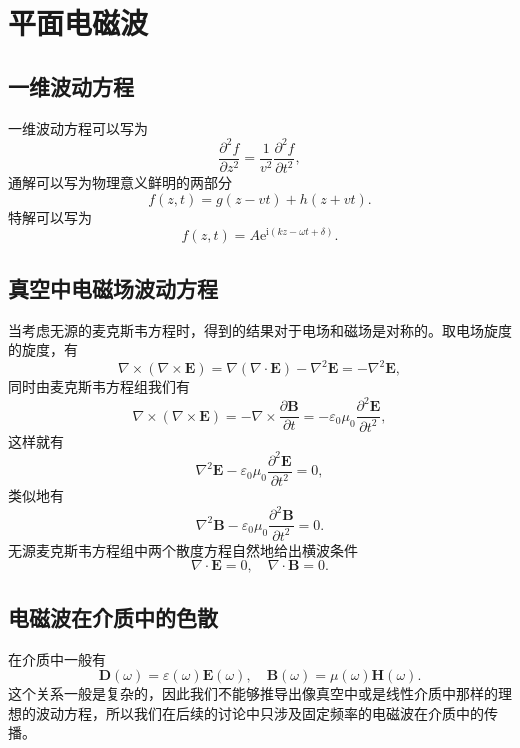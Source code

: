\documentclass[UTF8]{ctexbook}
\newcommand{\e}{\mathrm{e}}
\renewcommand{\b}{\boldsymbol}
\renewcommand{\i}{\mathrm{i}}
\numberwithin{equation}{chapter}
\begin{document}
	\section{平面电磁波}
	\subsection{一维波动方程}
	一维波动方程可以写为
	\[\frac{\partial^2 f}{\partial z^2}=\frac{1}{v^2}\frac{\partial^2 f}{\partial t^2},\]
	通解可以写为物理意义鲜明的两部分
	\[f(z,t)=g(z-vt)+h(z+vt).\]
	特解可以写为
	\[f(z,t)=A\e^{\i(kz-\omega t+\delta)}.\]
	
	\subsection{真空中电磁场波动方程}
	当考虑无源的麦克斯韦方程时，得到的结果对于电场和磁场是对称的。取电场旋度的旋度，有
	\[\nabla\times(\nabla\times\b{E})=\nabla(\nabla\cdot\b{E})-\nabla^2\b{E}=-\nabla^2\b{E},\]
	同时由麦克斯韦方程组我们有
	\[\nabla\times(\nabla\times\b{E})=-\nabla\times\frac{\partial \b{B}}{\partial t} = -\varepsilon_0\mu_0\frac{\partial^2\b{E}}{\partial t^2},\]
	这样就有
	\[\nabla^2\b{E}-\varepsilon_0\mu_0\frac{\partial^2 \b{E}}{\partial t^2}=0,\]
	类似地有
	\[\nabla^2\b{B}-\varepsilon_0\mu_0\frac{\partial^2 \b{B}}{\partial t^2}=0.\]
	无源麦克斯韦方程组中两个散度方程自然地给出横波条件
	\[\nabla\cdot\b{E}=0,\quad \nabla\cdot\b{B}=0.\]
	
	\subsection{电磁波在介质中的色散}
	在介质中一般有
	\[\b{D}(\omega)=\varepsilon(\omega)\b{E}(\omega),\quad \b{B}(\omega)=\mu(\omega)\b{H}(\omega).\]
	这个关系一般是复杂的，因此我们不能够推导出像真空中或是线性介质中那样的理想的波动方程，所以我们在后续的讨论中只涉及固定频率的电磁波在介质中的传播。
	
\end{document}
